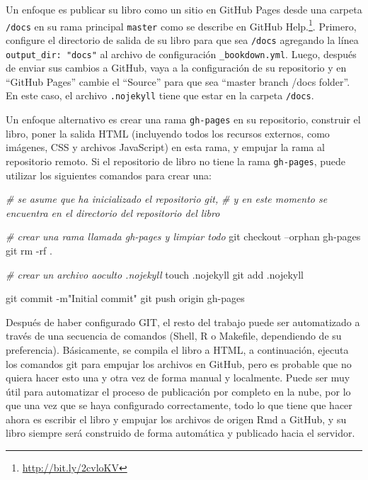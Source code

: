 \documentclass[12pt,]{krantz}
\makeatletter
\newenvironment{Shaded}{\begin{snugshade}}{\end{snugshade}}
\newcommand{\StringTok}[1]{\textcolor[rgb]{0.31,0.60,0.02}{#1}}
\newcommand{\CommentTok}[1]{\textcolor[rgb]{0.56,0.35,0.01}{\textit{#1}}}
\newcommand{\FunctionTok}[1]{\textcolor[rgb]{0.00,0.00,0.00}{#1}}
\newcommand{\NormalTok}[1]{#1}
\renewcommand{\href}[2]{#2\footnote{\url{#1}}}
\newenvironment{kframe}{%
\medskip{}
\setlength{\fboxsep}{.8em}
 \def\at@end@of@kframe{}%
 \ifinner\ifhmode%
  \def\at@end@of@kframe{\end{minipage}}%
  \begin{minipage}{\columnwidth}%
 \fi\fi%
 \def\FrameCommand##1{\hskip\@totalleftmargin \hskip-\fboxsep
 \colorbox{shadecolor}{##1}\hskip-\fboxsep
     \hskip-\linewidth \hskip-\@totalleftmargin \hskip\columnwidth}%
 \MakeFramed {\advance\hsize-\width
   \@totalleftmargin\z@ \linewidth\hsize
   \@setminipage}}%
 {\par\unskip\endMakeFramed%
 \at@end@of@kframe}
\renewenvironment{Shaded}{\begin{kframe}}{\end{kframe}}
\theoremstyle{definition}
\theoremstyle{definition}
\theoremstyle{definition}
\theoremstyle{remark}
\makeatother
\begin{document}
Un enfoque es publicar su libro como un sitio en GitHub Pages desde una
carpeta \texttt{/docs} en su rama principal \texttt{master} como se
describe en \href{http://bit.ly/2cvloKV}{GitHub Help.}. Primero,
configure el directorio de salida de su libro para que sea
\texttt{/docs} agregando la línea \texttt{output\_dir:\ "docs"} al
archivo de configuración \texttt{\_bookdown.yml}. Luego, después de
enviar sus cambios a GitHub, vaya a la configuración de su repositorio y
en ``GitHub Pages'' cambie el ``Source'' para que sea ``master branch
/docs folder''. En este caso, el archivo \texttt{.nojekyll} tiene que
estar en la carpeta \texttt{/docs}.

Un enfoque alternativo es crear una rama \texttt{gh-pages} en su
repositorio, construir el libro, poner la salida HTML (incluyendo todos
los recursos externos, como imágenes, CSS y archivos JavaScript) en esta
rama, y empujar la rama al repositorio remoto. Si el repositorio de
libro no tiene la rama \texttt{gh-pages}, puede utilizar los siguientes
comandos para crear una:

\begin{Shaded}
\begin{Highlighting}[]
\CommentTok{# se asume que ha inicializado el repositorio git,}
\CommentTok{# y en este momento se encuentra en el directorio del repositorio del libro}

\CommentTok{# crear una rama llamada gh-pages y limpiar todo}
\FunctionTok{git}\NormalTok{ checkout --orphan gh-pages}
\FunctionTok{git}\NormalTok{ rm -rf .}

\CommentTok{# crear un archivo aoculto .nojekyll}
\FunctionTok{touch}\NormalTok{ .nojekyll}
\FunctionTok{git}\NormalTok{ add .nojekyll}

\FunctionTok{git}\NormalTok{ commit -m}\StringTok{"Initial commit"}
\FunctionTok{git}\NormalTok{ push origin gh-pages}
\end{Highlighting}
\end{Shaded}

Después de haber configurado GIT, el resto del trabajo puede ser
automatizado a través de una secuencia de comandos (Shell, R o Makefile,
dependiendo de su preferencia). Básicamente, se compila el libro a HTML,
a continuación, ejecuta los comandos git para empujar los archivos en
GitHub, pero es probable que no quiera hacer esto una y otra vez de
forma manual y localmente. Puede ser muy útil para automatizar el
proceso de publicación por completo en la nube, por lo que una vez que
se haya configurado correctamente, todo lo que tiene que hacer ahora es
escribir el libro y empujar los archivos de origen Rmd a GitHub, y su
libro siempre será construido de forma automática y publicado hacia el
servidor.
\end{document}
